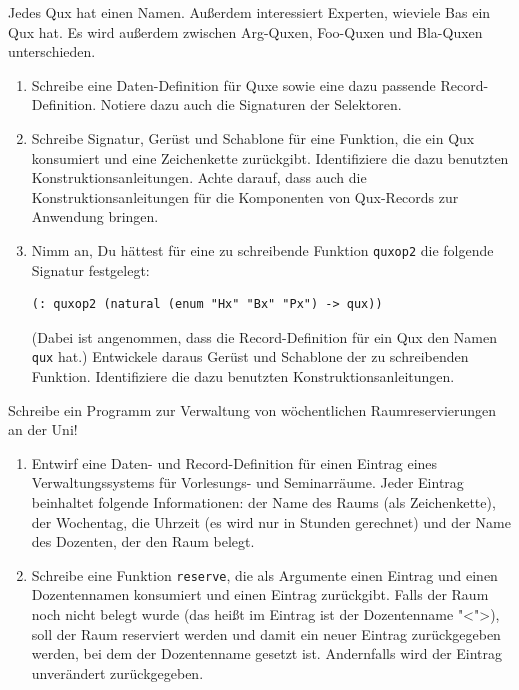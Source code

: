 \begin{aufgabe}

  Jedes Qux hat einen Namen.  Außerdem interessiert
  Experten, wieviele Bas ein Qux hat.  Es wird außerdem zwischen
  Arg-Quxen, Foo-Quxen und Bla-Quxen unterschieden.
  \begin{enumerate}
  \item Schreibe eine Daten-Definition für Quxe sowie eine dazu
    passende Record-Definition. Notiere dazu auch die Signaturen der
    Selektoren.
  \item Schreibe Signatur, Gerüst und Schablone für eine Funktion,
    die ein Qux konsumiert und eine Zeichenkette zurückgibt.
    Identifiziere die dazu benutzten Konstruktionsanleitungen.
    Achte darauf, dass auch die Konstruktionsanleitungen für die
    Komponenten von Qux-Records zur Anwendung bringen.
  \item Nimm an, Du hättest für eine zu schreibende Funktion
    \texttt{quxop2} die folgende Signatur festgelegt:
\begin{verbatim}
(: quxop2 (natural (enum "Hx" "Bx" "Px") -> qux))
\end{verbatim}
    (Dabei ist angenommen, dass die Record-Definition für ein Qux
    den Namen \texttt{qux} hat.) Entwickele daraus Gerüst und
    Schablone der zu schreibenden Funktion.  Identifiziere die dazu
    benutzten Konstruktionsanleitungen.
  \end{enumerate}

\end{aufgabe}

\begin{aufgabe}

  Schreibe ein Programm zur Verwaltung von wöchentlichen
  Raumreservierungen an der Uni!

  \begin{enumerate}
  \item Entwirf eine Daten- und Record-Definition für einen Eintrag eines
    Verwaltungssystems für Vorlesungs- und Seminarräume. Jeder Eintrag beinhaltet
    folgende Informationen: der Name des Raums (als Zeichenkette), der Wochentag,
    die Uhrzeit (es wird nur in Stunden gerechnet) und der Name des Dozenten, der
    den Raum belegt.

  \item Schreibe eine Funktion \texttt{reserve}, die als Argumente einen Eintrag und einen
    Dozentennamen konsumiert und einen Eintrag zurückgibt. Falls der Raum noch nicht belegt
    wurde (das heißt im Eintrag ist der Dozentenname "<">), soll der Raum reserviert werden und
    damit ein neuer Eintrag zurückgegeben werden, bei dem der Dozentenname gesetzt ist.
    Andernfalls wird der Eintrag unverändert zurückgegeben.
  \end{enumerate}
\end{aufgabe}


